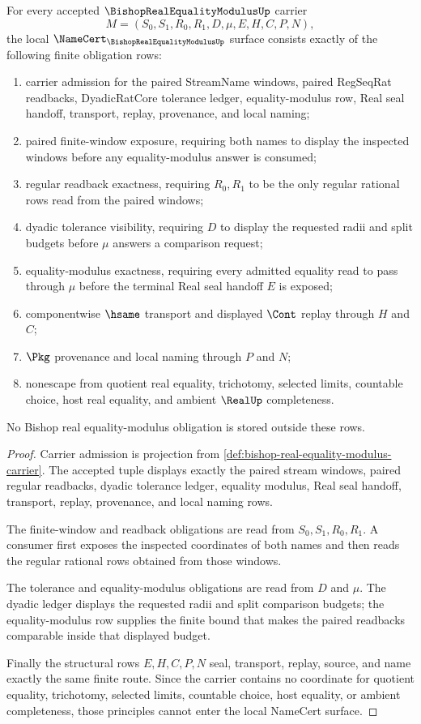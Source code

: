 \begin{theorem}
\label{thm:bishop-real-equality-modulus-namecert-obligations}
For every accepted $\BishopRealEqualityModulusUp$ carrier
$$
M=(S_0,S_1,R_0,R_1,D,\mu,E,H,C,P,N),
$$
the local $\NameCert_{\BishopRealEqualityModulusUp}$ surface consists exactly of the following finite obligation rows:
\begin{enumerate}
\item carrier admission for the paired StreamName windows, paired RegSeqRat readbacks, DyadicRatCore tolerance ledger, equality-modulus row, Real seal handoff, transport, replay, provenance, and local naming;
\item paired finite-window exposure, requiring both names to display the inspected windows before any equality-modulus answer is consumed;
\item regular readback exactness, requiring $R_0,R_1$ to be the only regular rational rows read from the paired windows;
\item dyadic tolerance visibility, requiring $D$ to display the requested radii and split budgets before $\mu$ answers a comparison request;
\item equality-modulus exactness, requiring every admitted equality read to pass through $\mu$ before the terminal Real seal handoff $E$ is exposed;
\item componentwise $\hsame$ transport and displayed $\Cont$ replay through $H$ and $C$;
\item $\Pkg$ provenance and local naming through $P$ and $N$;
\item nonescape from quotient real equality, trichotomy, selected limits, countable choice, host real equality, and ambient $\RealUp$ completeness.
\end{enumerate}
No Bishop real equality-modulus obligation is stored outside these rows.
\end{theorem}
\begin{proof}
Carrier admission is projection from \autoref{def:bishop-real-equality-modulus-carrier}. The accepted tuple displays exactly the paired stream windows, paired regular readbacks, dyadic tolerance ledger, equality modulus, Real seal handoff, transport, replay, provenance, and local naming rows.

The finite-window and readback obligations are read from $S_0,S_1,R_0,R_1$. A consumer first exposes the inspected coordinates of both names and then reads the regular rational rows obtained from those windows.

The tolerance and equality-modulus obligations are read from $D$ and $\mu$. The dyadic ledger displays the requested radii and split comparison budgets; the equality-modulus row supplies the finite bound that makes the paired readbacks comparable inside that displayed budget.

Finally the structural rows $E,H,C,P,N$ seal, transport, replay, source, and name exactly the same finite route. Since the carrier contains no coordinate for quotient equality, trichotomy, selected limits, countable choice, host equality, or ambient completeness, those principles cannot enter the local NameCert surface.
\end{proof}

